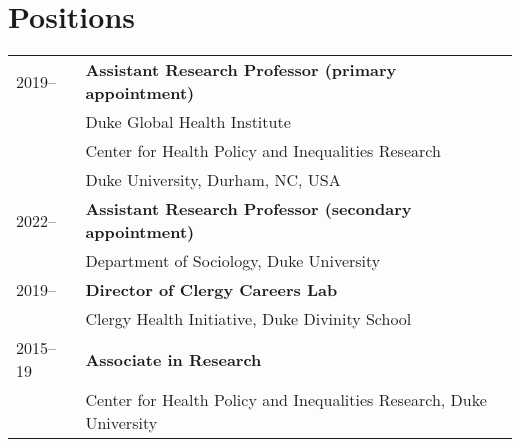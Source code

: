 \vspace{3ex}
\section*{Positions}
\begin{longtable}{p{} p{}}
2019-- & \textbf{Assistant Research Professor (primary appointment)}\\
		             & Duke Global Health Institute\\
		             & Center for Health Policy and Inequalities Research\\
		             &Duke University, Durham, NC, USA \\
		             
		             2022-- & \textbf{Assistant Research Professor (secondary appointment)}\\
		             & Department of Sociology, Duke University \\
		             
  		             2019--  & \textbf{Director of Clergy Careers Lab}\\
  		             & Clergy Health Initiative, Duke Divinity School\\
		             
2015--19 & \textbf{Associate in Research}\\
& Center for Health Policy and Inequalities Research, Duke University\\
\end{longtable}
